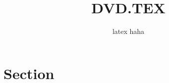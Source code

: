 \documentclass[11pt]{scrartcl}
\title{DVD.TEX}
\subtitle{latex haha}
\date{}
\begin{document}
\maketitle
\section{Section}
\end{document}
